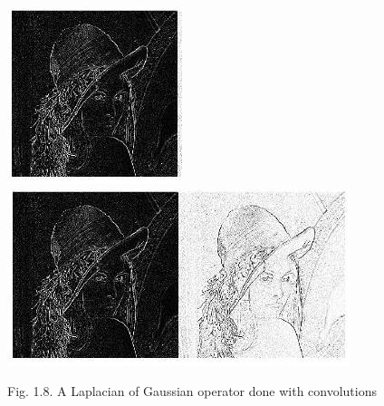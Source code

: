 \documentclass[10pt]{article}
\begin{document}
\includegraphics[max width=\textwidth]{2022_01_06_b5ce182ed1bd5f482e5bg-14(3)}\\

\includegraphics[max width=\textwidth]{2022_01_06_b5ce182ed1bd5f482e5bg-14(4)}

Fig. 1.8. A Laplacian of Gaussian operator done with convolutions
\end{document}
